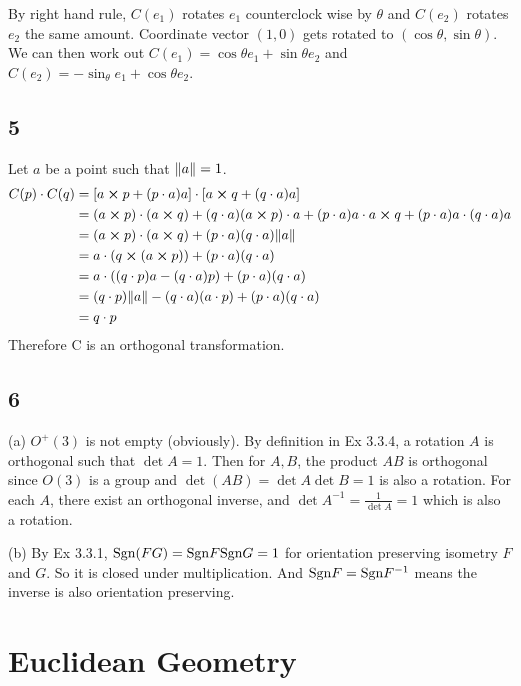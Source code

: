 \documentclass[12pt]{article}
\begin{document}
By right hand rule, $C(e_1)$ rotates $e_1$ counterclock wise by $\theta$ and $C(e_2)$ rotates $e_2$ the same amount. Coordinate vector $(1, 0)$ gets rotated to $(\cos\theta, \sin\theta)$. We can then work out $C(e_1) = \cos\theta e_1 + \sin \theta e_2$ and $C(e_2) = -\sin_\theta e_1 + \cos \theta e_2$.

\subsection*{5}
Let $a$ be a point such that $\norm{a} = 1$. 
$$
\begin{aligned}
	C(p) \cdot C(q) &= [a \cross p + (p \cdot a) a] \cdot [a \cross q + ( q \cdot a) a] \\
	&= (a \cross p) \cdot (a \cross q)  + ( q \cdot a) (a \cross p)\cdot a +  (p \cdot a) a \cdot a \cross q + (p \cdot a) a \cdot  ( q \cdot a) a \\
	&=  (a \cross p) \cdot (a \cross q) + (p \cdot a) ( q \cdot a) \norm{a} \\
	&=   a \cdot (q \cross (a \cross p)) + (p \cdot a) ( q \cdot a)	\\
	&=   a \cdot ((q \cdot p)a - (q \cdot a) p ) + (p \cdot a) ( q \cdot a)	\\
	&=  (q \cdot p) \norm{a} - (q \cdot a) (a\cdot p ) + (p \cdot a) ( q \cdot a)	\\
	&=  q \cdot p	\\
\end{aligned} $$
Therefore C is an orthogonal transformation.
\QED

\subsection*{6}
(a) $O^+(3)$ is not empty (obviously). By definition in Ex 3.3.4, a rotation $A$ is orthogonal such that $\det A = 1$. Then for $A, B$,  the product $AB$ is orthogonal since $O(3)$ is a group and $\det(AB) = \det A \det B = 1 $ is also a rotation.  For each $A$, there exist an orthogonal inverse, and $\det A^{-1} = \frac{1}{\det A} = 1$ which is also a rotation.

(b) By Ex 3.3.1,  $\mbox{Sgn}(FG) = \mbox{Sgn} F \mbox{Sgn} G = 1$ for orientation preserving isometry $F$ and $G$. So it is closed under multiplication. And $\mbox{Sgn} F = \mbox{Sgn} F^{-1}$ means the inverse is also orientation preserving.

\section{Euclidean Geometry}
\end{document}
